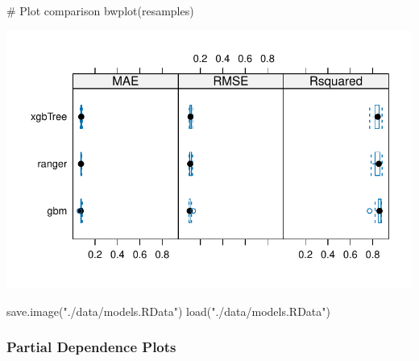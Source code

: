 \documentclass[
  letterpaper,
  DIV=11,
  numbers=noendperiod]{scrartcl}
\newenvironment{Shaded}{\begin{snugshade}}{\end{snugshade}}
\newcommand{\CommentTok}[1]{\textcolor[rgb]{0.37,0.37,0.37}{#1}}
\newcommand{\FunctionTok}[1]{\textcolor[rgb]{0.28,0.35,0.67}{#1}}
\newcommand{\NormalTok}[1]{\textcolor[rgb]{0.00,0.23,0.31}{#1}}
\newcommand{\StringTok}[1]{\textcolor[rgb]{0.13,0.47,0.30}{#1}}
\begin{document}
\begin{Shaded}
\begin{Highlighting}[]
\CommentTok{\# Plot comparison}
\FunctionTok{bwplot}\NormalTok{(resamples)}
\end{Highlighting}
\end{Shaded}

\includegraphics{MachineLearning_StaticPatterNN_Report_files/figure-pdf/final-models-comparison-2.pdf}

\begin{Shaded}
\begin{Highlighting}[]
\FunctionTok{save.image}\NormalTok{(}\StringTok{"./data/models.RData"}\NormalTok{)}
\FunctionTok{load}\NormalTok{(}\StringTok{"./data/models.RData"}\NormalTok{)}
\end{Highlighting}
\end{Shaded}

\subsubsection{Partial Dependence Plots}\label{partial-dependence-plots}
\end{document}
